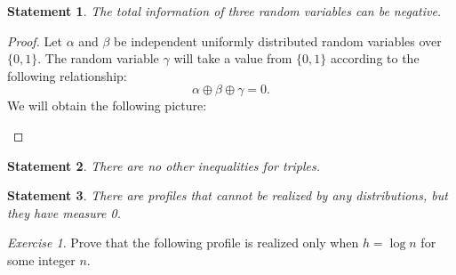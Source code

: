 \documentclass[12pt,sans]{article}
\theoremstyle{definition}
\theoremstyle{plain}
\newtheorem{statement}{Statement}[section]
\theoremstyle{remark}
\newtheorem{exercise}{Exercise}[section]
\begin{document}
\begin{statement}
    The total information of three random variables can be negative.
\end{statement}
\begin{proof}
    Let \(\alpha\) and \(\beta\) be independent uniformly distributed random variables over \(\{0, 1\}\). The random variable \(\gamma\) will take a value from \(\{0, 1\}\) according to the following relationship:
    \[
        \alpha \oplus \beta \oplus \gamma = 0.
    \]
    We will obtain the following picture:

    \begin{center}
    \end{center}
\end{proof}
\begin{statement}
    There are no other inequalities for triples.
\end{statement}
\begin{statement}
    There are profiles that cannot be realized by any distributions, but they have measure 0.
\end{statement}
\begin{exercise}
    Prove that the following profile is realized only when \(h = \log n\) for some integer \(n\).
    \begin{center}
    \end{center}
\end{exercise}
\end{document}

